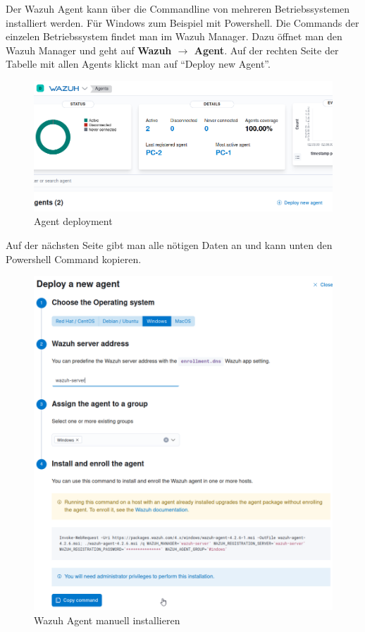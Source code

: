 Der Wazuh Agent kann über die Commandline von mehreren Betriebssystemen installiert werden.
Für Windows zum Beispiel mit Powershell.
Die Commands der einzelen Betriebssystem findet man im Wazuh Manager.
Dazu öffnet man den Wazuh Manager und geht auf \textbf{Wazuh $\rightarrow$ Agent}.
Auf der rechten Seite der Tabelle mit allen Agents klickt man auf ``Deploy new Agent''.
\begin{figure}[H]
    \centering
    \includegraphics[width=\linewidth]{../img/agent/deploy-new-agent.png}
    \caption{Agent deployment}
\end{figure}

Auf der nächsten Seite gibt man alle nötigen Daten an und kann unten den Powershell Command kopieren.
\begin{figure}[H]
    \centering
    \includegraphics[width=\linewidth]{../img/agent/deploy-new-agent-2.png}
    \caption{Wazuh Agent manuell installieren}
\end{figure}

